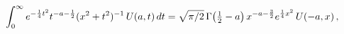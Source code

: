 \[\int_{0}^{\infty}e^{-\frac{1}{4}t^{2}}t^{-a-\frac{1}{2}}(x^{2}+t^{2})^{-1}%
\mathop{U\/}\nolimits\!\left(a,t\right)dt=\sqrt{\pi/2}\mathop{\Gamma\/}%
\nolimits\!\left(\tfrac{1}{2}-a\right)x^{-a-\frac{3}{2}}e^{\frac{1}{4}x^{2}}%
\mathop{U\/}\nolimits\!\left(-a,x\right),\]
